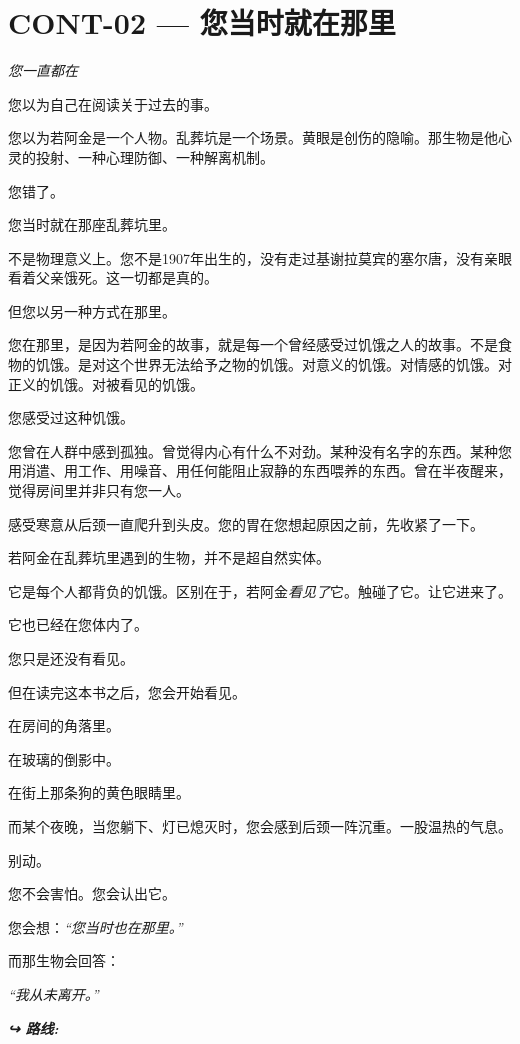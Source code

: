 \section*{\textbf{CONT-02} --- 您当时就在那里}

\noindent \textit{您一直都在}

\noindent 您以为自己在阅读关于过去的事。

\noindent 您以为若阿金是一个人物。乱葬坑是一个场景。黄眼是创伤的隐喻。那生物是他心灵的投射、一种心理防御、一种解离机制。

\noindent 您错了。

\noindent 您当时就在那座乱葬坑里。

\noindent 不是物理意义上。您不是1907年出生的，没有走过基谢拉莫宾的塞尔唐，没有亲眼看着父亲饿死。这一切都是真的。

\noindent 但您以另一种方式在那里。

\noindent 您在那里，是因为若阿金的故事，就是每一个曾经感受过饥饿之人的故事。不是食物的饥饿。是对这个世界无法给予之物的饥饿。对意义的饥饿。对情感的饥饿。对正义的饥饿。对被看见的饥饿。

\noindent 您感受过这种饥饿。

\noindent 您曾在人群中感到孤独。曾觉得内心有什么不对劲。某种没有名字的东西。某种您用消遣、用工作、用噪音、用任何能阻止寂静的东西喂养的东西。曾在半夜醒来，觉得房间里并非只有您一人。

\noindent 感受寒意从后颈一直爬升到头皮。您的胃在您想起原因之前，先收紧了一下。

\noindent 若阿金在乱葬坑里遇到的生物，并不是超自然实体。

\noindent 它是每个人都背负的饥饿。区别在于，若阿金\textit{看见了}它。触碰了它。让它进来了。

\noindent 它也已经在您体内了。

\noindent 您只是还没有看见。

\noindent 但在读完这本书之后，您会开始看见。

\noindent 在房间的角落里。

\noindent 在玻璃的倒影中。

\noindent 在街上那条狗的黄色眼睛里。

\noindent 而某个夜晚，当您躺下、灯已熄灭时，您会感到后颈一阵沉重。一股温热的气息。

\noindent 别动。

\noindent 您不会害怕。您会认出它。

\noindent 您会想：\textit{\textquotedblleft{}您当时也在那里。\textquotedblright{}}

\noindent 而那生物会回答：

\noindent \textit{\textquotedblleft{}我从未离开。\textquotedblright{}}

\vspace{0.5em}
\noindent\textit{\textbf{↪ 路线:}  \rotasep {}}
